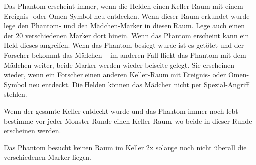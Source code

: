 \newpage



  \begin{itemize}
        \bitem Das Phantom erscheint immer, wenn die Helden einen Keller-Raum mit einem Ereignis- oder Omen-Symbol neu entdecken. Wenn dieser Raum erkundet wurde lege den Phantom- und den Mädchen-Marker in diesen Raum.
Lege auch einen der 20 verschiedenen Marker dort hinein.
        \bitem Wenn das Phantom erscheint kann ein Held dieses angreifen. Wenn das Phantom besiegt wurde ist es getötet und der Forscher bekommt das Mädchen – im anderen Fall flieht das Phantom mit dem Mädchen weiter, beide Marker werden wieder beiseite gelegt. Sie erscheinen wieder, wenn ein Forscher einen anderen Keller-Raum mit Ereignis- oder Omen- Symbol neu entdeckt.
        \bitem Die Helden können das Mädchen nicht per Spezial-Angriff stehlen.

        \bitem Wenn der gesamte Keller entdeckt wurde und das Phantom immer noch lebt bestimme vor jeder Monster-Runde einen Keller-Raum, wo beide in dieser Runde erscheinen werden.

        \bitem Das Phantom besucht keinen Raum im Keller 2x solange noch nicht überall die verschiedenen Marker liegen.
    \end{itemize}


